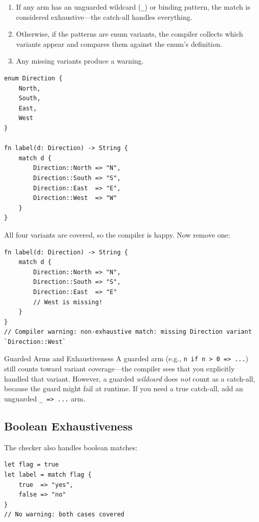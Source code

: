 \begin{enumerate}
  \item If any arm has an unguarded wildcard (\lstinline|_|) or binding
    pattern, the match is considered exhaustive---the catch-all handles
    everything.
  \item Otherwise, if the patterns are enum variants, the compiler collects
    which variants appear and compares them against the enum's definition.
  \item Any missing variants produce a warning.
\end{enumerate}

\begin{lstlisting}[language=Lattice, caption={An exhaustive match---no warning}]
enum Direction {
    North,
    South,
    East,
    West
}

fn label(d: Direction) -> String {
    match d {
        Direction::North => "N",
        Direction::South => "S",
        Direction::East  => "E",
        Direction::West  => "W"
    }
}
\end{lstlisting}

All four variants are covered, so the compiler is happy. Now remove one:

\begin{lstlisting}[language=Lattice, caption={A non-exhaustive match---compiler warns}]
fn label(d: Direction) -> String {
    match d {
        Direction::North => "N",
        Direction::South => "S",
        Direction::East  => "E"
        // West is missing!
    }
}
// Compiler warning: non-exhaustive match: missing Direction variant `Direction::West`
\end{lstlisting}

\begin{warnbox}{Guarded Arms and Exhaustiveness}
A guarded arm (e.g., \lstinline|n if n > 0 => ...|) still counts toward
variant coverage---the compiler sees that you explicitly handled that
variant. However, a guarded \emph{wildcard} does \emph{not} count as a
catch-all, because the guard might fail at runtime. If you need a true
catch-all, add an unguarded \lstinline|_ => ...| arm.
\end{warnbox}

\subsection{Boolean Exhaustiveness}

The checker also handles boolean matches:

\begin{lstlisting}[language=Lattice, caption={Boolean exhaustiveness}]
let flag = true
let label = match flag {
    true  => "yes",
    false => "no"
}
// No warning: both cases covered
\end{lstlisting}

